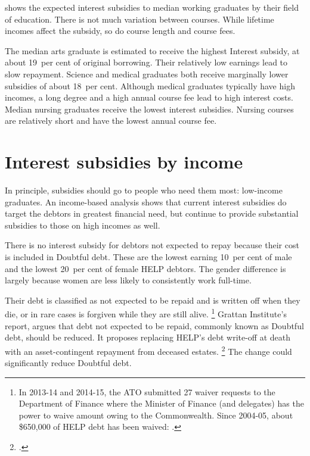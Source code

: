 \documentclass[embargoed]{grattan}
\begin{document}
 shows the expected interest subsidies to median working graduates by their field of education. There is not much variation between courses. While lifetime incomes affect the subsidy, so do course length and course fees.



The median arts graduate is estimated to receive the highest \gls{Interest subsidy}, at about 19~per cent of original borrowing.
Their relatively low earnings lead to slow repayment.
Science and medical graduates both receive marginally lower subsidies of about 18~per cent.
Although medical graduates typically have high incomes, a long degree and a high annual course fee lead to high interest costs.
Median nursing graduates receive the lowest interest subsidies.
Nursing courses are relatively short and have the lowest annual course fee.

\section{Interest subsidies by income}\label{sec:interest-subsidies-by-income}

In principle, subsidies should go to people who need them most: low-income graduates.
An income-based analysis shows that current interest subsidies do target the debtors in greatest financial need, but continue to provide substantial subsidies to those on high incomes as well.

There is no interest subsidy for debtors not expected to repay because their cost is included in \gls{Doubtful debt}.
These are the lowest earning 10~per cent of male and the lowest 20~per cent of female \gls{HELP} debtors.
The gender difference is largely because women are less likely to consistently work full-time.

Their debt is classified as not expected to be repaid and is written off when they die, or in rare cases is forgiven while they are still alive.%
\footnote{In 2013-14 and 2014-15, the \gls{ATO} submitted 27 waiver requests to the Department of Finance where the Minister of Finance (and delegates) has the power to waive amount owing to the Commonwealth.
Since 2004-05, about \$650,000 of \gls{HELP} debt has been waived: \textcite[][38]{ANAO2016AdministrationHigherEducation}.} Grattan Institute's \citeyear{Norton2014Doubtfuldebtrising} report,  argues that debt not expected to be repaid, commonly known as \gls{Doubtful debt}, should be reduced.
It proposes replacing \gls{HELP}'s debt write-off at death with an asset-contingent repayment from deceased estates.%
\footcite{Norton2014Doubtfuldebtrising} 
The change could significantly reduce \gls{Doubtful debt}.
\end{document}
